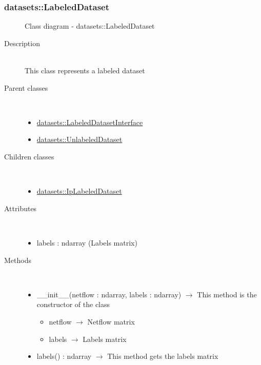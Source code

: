 \subsubsection[LabeledDataset]{datasets::LabeledDataset}
\begin{figure}[h]
\centering
{}
\caption{Class diagram - datasets::LabeledDataset}
\end{figure}\begin{description}
\item[Description] \hfill \\
 This class represents a labeled dataset
\item[Parent classes] \hfill \\
 \vspace{-1cm}
\begin{itemize}
\item \hyperlink{datasets::LabeledDatasetInterface}{datasets::LabeledDatasetInterface}
\item \hyperlink{datasets::UnlabeledDataset}{datasets::UnlabeledDataset}
\end{itemize}

\item[Children classes] \hfill \\
 \vspace{-1cm}
\begin{itemize}
\item \hyperlink{datasets::IpLabeledDataset}{datasets::IpLabeledDataset}
\end{itemize}

\item[Attributes] \hfill \\
 \vspace{-1cm}
\begin{itemize}
\item labels : ndarray (Labels matrix)
\end{itemize}

\item[Methods] \hfill \\
 \vspace{-1cm}
\begin{itemize}
\item \_\_init\_\_(netflow : ndarray, labels : ndarray) $\rightarrow$ This method is the constructor of the class\begin{itemize}
\item netflow $\rightarrow$ Netflow matrix
\item labels $\rightarrow$ Labels matrix
\end{itemize}

\item labels() : ndarray $\rightarrow$ This method gets the labels matrix
\end{itemize}

\end{description}
\hypertarget{datasets::IpLabeledDataset}{}
